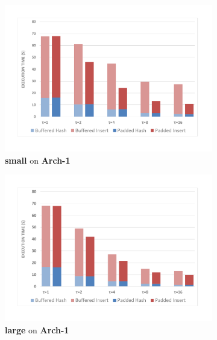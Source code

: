 \documentclass[10pt, conference, compsocconf]{IEEEtran}
\begin{document}
\begin{figure}[htbp]
\begin{subfigure}[t]{0.45\textwidth}
\includegraphics[width=\linewidth]{expfigs/8x211gandalf.pdf}
\caption{{\bf small} on {\bf Arch-1}}
\label{fig:8x211arch1}
\end{subfigure}
\begin{subfigure}[t]{0.45\textwidth}\hspace*{-10ex}
\includegraphics[width=\linewidth]{expfigs/8x2003gandalf.pdf}
\caption{{\bf large} on {\bf Arch-1}}
\label{fig:8x2003arch1}
\end{subfigure}
\begin{subfigure}[t]{0.45\textwidth}

\end{subfigure}
\end{figure}
\end{document}
